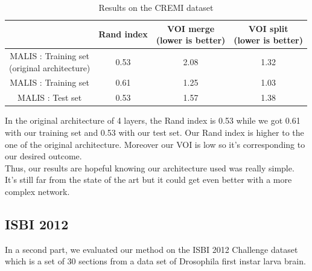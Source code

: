 \begin{table}[!htbp]
	\centering
	\begin{tabular}{|c|c|c|c|}
		\hline
		& Rand index & \thead{VOI merge \\(lower is better)} & \thead{VOI split\\(lower is better)} \\
		\hline
		\makecell{MALIS : Training set \\(original architecture)} & 0.53 & 2.08 & 1.32\\
		\hline
		MALIS : Training set & 0.61 & 1.25 & 1.03\\
		\hline
		MALIS : Test set & 0.53 & 1.57 & 1.38\\
		\hline
	\end{tabular}
	\caption{Results on the CREMI dataset}
\label{tab:cremi_res}
\end{table}

In the original architecture of 4 layers, the Rand index is 0.53 while we got 0.61 with our training set and 0.53 with our test set.
Our Rand index is higher to the one of the original architecture.
Moreover our VOI is low so it's corresponding to our desired outcome.\\

Thus, our results are hopeful knowing our architecture used was really simple.\\ 
It's still far from the state of the art but it could get even better with a more complex network.\\

\subsection{ISBI 2012}
In a second part, we evaluated our method on the ISBI 2012 Challenge dataset which is a set of 30 sections from a data set of Drosophila first instar larva brain.\\

